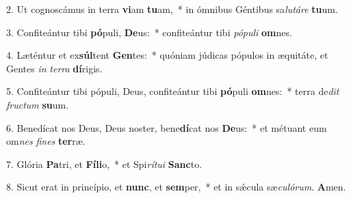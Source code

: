2. Ut cognoscámus in terra \textbf{vi}am \textbf{tu}am,~*  in ómnibus Géntibus sa\textit{lu}\textit{tá}\textit{re} \textbf{tu}um.\

3. Confiteántur tibi \textbf{pó}puli, \textbf{De}us:~*  confiteántur tibi \textit{pó}\textit{pu}\textit{li} \textbf{om}nes.\

4. Læténtur et ex\textbf{súl}tent \textbf{Gen}tes:~*  quóniam júdicas pópulos in æquitáte, et Gentes \textit{in} \textit{ter}\textit{ra} \textbf{dí}rigis.\

5. Confiteántur tibi pópuli, Deus, confiteántur tibi \textbf{pó}puli \textbf{om}nes:~*  terra de\textit{dit} \textit{fruc}\textit{tum} \textbf{su}um.\

6. Benedícat nos Deus, Deus noster, bene\textbf{dí}cat nos \textbf{De}us:~*  et métuant eum om\textit{nes} \textit{fi}\textit{nes} \textbf{ter}ræ.\

7. Glória \textbf{Pa}tri, et \textbf{Fí}\textbf{li}o,~*  et Spi\textit{rí}\textit{tu}\textit{i} \textbf{Sanc}to.\

8. Sicut erat in princípio, et \textbf{nunc}, et \textbf{sem}per,~*  et in sǽcula sæ\textit{cu}\textit{ló}\textit{rum}. \textbf{A}men.\

